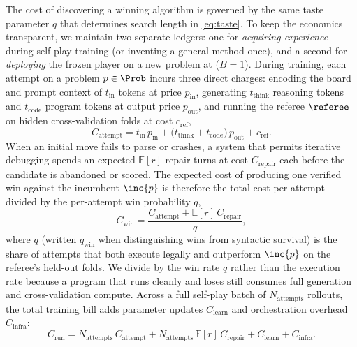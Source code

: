 The cost of discovering a winning algorithm is governed by the same taste parameter $q$ that determines search length in \cref{eq:taste}. To keep the economics transparent, we maintain two separate ledgers: one for \emph{acquiring experience} during self-play training (or inventing a general method once), and a second for \emph{deploying} the frozen player on a new problem at \searchone{} ($B = 1$). During training, each attempt on a problem $p \in \Prob$ incurs three direct charges: encoding the board and prompt context of $t_{\text{in}}$ tokens at price $p_{\text{in}}$, generating $t_{\text{think}}$ reasoning tokens and $t_{\text{code}}$ program tokens at output price $p_{\text{out}}$, and running the referee $\referee$ on hidden cross-validation folds at cost $c_{\text{ref}}$,
\begin{equation*}
  C_{\text{attempt}} = t_{\text{in}}\,p_{\text{in}} + \bigl(t_{\text{think}} + t_{\text{code}}\bigr)\,p_{\text{out}} + c_{\text{ref}}.
\end{equation*}
When an initial move fails to parse or crashes, a system that permits iterative debugging spends an expected $\mathbb{E}[r]$ repair turns at cost $C_{\text{repair}}$ each before the candidate is abandoned or scored. The expected cost of producing one verified win against the incumbent $\inc{p}$ is therefore the total cost per attempt divided by the per-attempt win probability $q$,
\begin{equation}
  C_{\text{win}} = \frac{C_{\text{attempt}} + \mathbb{E}[r]\,C_{\text{repair}}}{q},
  \label{eq:bill}\label{eq:batch-cost}
\end{equation}
where $q$ (written $q_{\text{win}}$ when distinguishing wins from syntactic survival) is the share of attempts that both execute legally and outperform $\inc{p}$ on the referee's held-out folds. We divide by the win rate $q$ rather than the execution rate because a program that runs cleanly and loses still consumes full generation and cross-validation compute. Across a full self-play batch of $N_{\text{attempts}}$ rollouts, the total training bill adds parameter updates $C_{\text{learn}}$ and orchestration overhead $C_{\text{infra}}$:
\begin{equation*}
  C_{\text{run}} = N_{\text{attempts}}\,C_{\text{attempt}} + N_{\text{attempts}}\,\mathbb{E}[r]\,C_{\text{repair}} + C_{\text{learn}} + C_{\text{infra}}.
\end{equation*}

